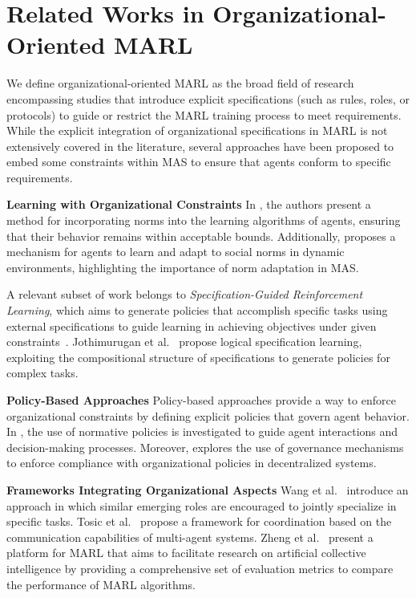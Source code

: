 \documentclass[conference]{IEEEtran}
\begin{document}
\section{Related Works in Organizational-Oriented MARL}
\label{sec:related_works}

We define organizational-oriented MARL as the broad field of research encompassing studies that introduce explicit specifications (such as rules, roles, or protocols) to guide or restrict the MARL training process to meet requirements. While the explicit integration of organizational specifications in MARL is not extensively covered in the literature, several approaches have been proposed to embed some constraints within MAS to ensure that agents conform to specific requirements.

\textbf{Learning with Organizational Constraints} \quad
In \cite{cruz2020norms}, the authors present a method for incorporating norms into the learning algorithms of agents, ensuring that their behavior remains within acceptable bounds. Additionally, \cite{villatoro2011social} proposes a mechanism for agents to learn and adapt to social norms in dynamic environments, highlighting the importance of norm adaptation in MAS.

A relevant subset of work belongs to \emph{Specification-Guided Reinforcement Learning}, which aims to generate policies that accomplish specific tasks using external specifications to guide learning in achieving objectives under given constraints~\cite{Bansal2022}. Jothimurugan et al.~\cite{Jothimurugan2021} propose logical specification learning, exploiting the compositional structure of specifications to generate policies for complex tasks.

\textbf{Policy-Based Approaches} \quad
Policy-based approaches provide a way to enforce organizational constraints by defining explicit policies that govern agent behavior. In \cite{krupanski2015norm}, the use of normative policies is investigated to guide agent interactions and decision-making processes. Moreover, \cite{vos2020governing} explores the use of governance mechanisms to enforce compliance with organizational policies in decentralized systems.

\textbf{Frameworks Integrating Organizational Aspects} \quad
Wang et al.~\cite{Wang2020} introduce an approach in which similar emerging roles are encouraged to jointly specialize in specific tasks. Tosic et al.~\cite{Tosic2010} propose a framework for coordination based on the communication capabilities of multi-agent systems. Zheng et al.~\cite{Zheng2018} present a platform for MARL that aims to facilitate research on artificial collective intelligence by providing a comprehensive set of evaluation metrics to compare the performance of MARL algorithms.
\end{document}
